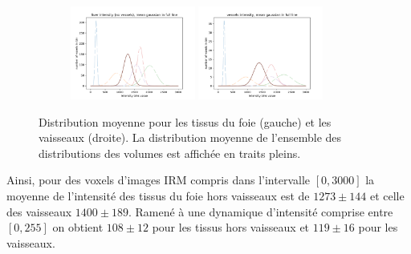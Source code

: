 \begin{figure}[!ht]
  \begin{subfigure}{\textwidth}
    \centering
    \includegraphics[width=0.45\textwidth]{Images/gen_mri_liver_mean_intensity.pdf}
    \includegraphics[width=0.45\textwidth]{Images/gen_mri_vessels_mean_intensity.pdf}
    
  \end{subfigure}
  \caption{Distribution moyenne pour les tissus du foie (gauche) et les vaisseaux (droite). La distribution moyenne de l'ensemble des distributions des volumes est affichée en traits pleins.}
  \label{fig:Distributions_mri_mean}
\end{figure}

Ainsi, pour des voxels d'images IRM compris dans l'intervalle $[0,3000]$ la moyenne de l'intensité des tissus du foie hors vaisseaux est de $1273 \pm 144$ et celle des vaisseaux $1400 \pm 189$. Ramené à une dynamique d'intensité comprise entre $[0, 255]$ on obtient $108 \pm 12$ pour les tissus hors vaisseaux et $119 \pm 16$ pour les vaisseaux. 

